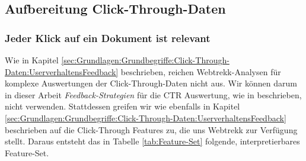 \subsection{Aufbereitung Click-Through-Daten}
\label{sec:Reranking:Methodik:Click-Through-Daten}

\subsubsection{Jeder Klick auf ein Dokument ist relevant}
\label{sec:Reranking:Methodik:Click-Through-Daten:Click-Through-DatenAuswertungen}

Wie in Kapitel \ref{sec:Grundlagen:Grundbegriffe:Click-Through-Daten:UserverhaltensFeedback} beschrieben, reichen Webtrekk-Analysen für komplexe Auswertungen der Click-Through-Daten nicht aus. Wir können darum in dieser Arbeit \textit{Feedback-Strategien} für die CTR Auswertung, wie in \cite{Joachims} beschrieben, nicht verwenden. Stattdessen greifen wir wie ebenfalls in Kapitel \ref{sec:Grundlagen:Grundbegriffe:Click-Through-Daten:UserverhaltensFeedback} beschrieben auf die Click-Through Features zu, die uns Webtrekk zur Verfügung stellt. Daraus entsteht das in Tabelle \ref{tab:Feature-Set} folgende, interpretierbares Feature-Set. 

\begin{table}[H]
\vspace{-.75em}
 \caption[Interpretierbares Feature-Set aus den Webtrekk Click-Through-Daten]{Interpretierbares Feature-Set aus den Webtrekk Click-Through-Daten}
\label{tab:Feature-Set}
\vspace{-.5em}
\footnotesize
\renewcommand*{\arraystretch}{1.2}
\vspace{-2em}
\end{table}

